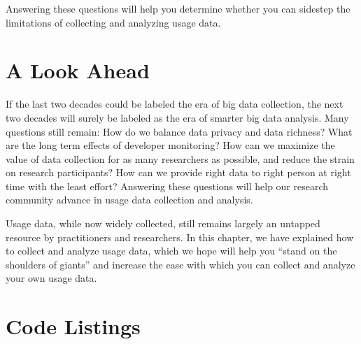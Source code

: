 \documentclass{book}
\begin{document}
\noindent
Answering these questions will help you determine whether you can sidestep
the limitations of collecting and analyzing usage data.

\section{A Look Ahead}

If the last two decades could be labeled the era
of big data collection,
the next two decades will surely be labeled as the
era of smarter big data analysis.
Many questions still remain:
How do we balance data privacy and data richness?
What are the long term effects of developer monitoring?
How can we maximize the value of data collection
for as many researchers as possible, and reduce the
strain on research participants? How can we provide right data to right person at right time with the least effort?
Answering these questions will help our research
community advance in usage data collection and analysis.

Usage data, while now widely collected, still remains largely
an untapped resource by practitioners and researchers.
In this chapter, we have explained how to collect and
analyze usage data, which we hope will help you ``stand
on the shoulders of giants'' and increase the ease
with which you can collect and analyze your own usage data.


\section{Code Listings}



 
\end{document}
